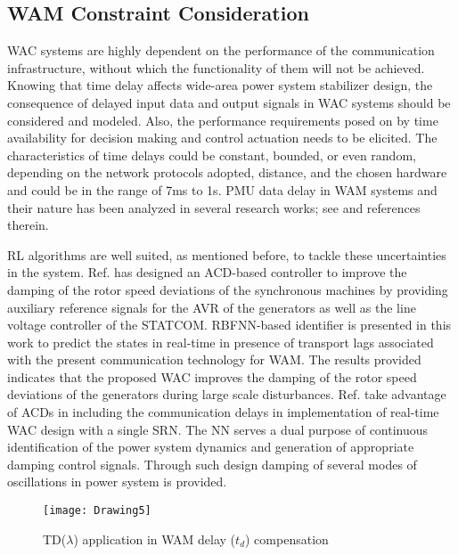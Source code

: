 \documentclass[journal]{IEEEtran}
\begin{document}
\subsection{WAM Constraint Consideration}
WAC systems are highly dependent on the performance of the communication infrastructure, without which the functionality of them  will not be achieved. Knowing that time delay affects wide-area power system stabilizer design, the consequence of delayed input data and output signals in WAC systems should be considered and modeled. Also, the performance requirements posed on by time availability for decision making and control actuation needs to be elicited. The characteristics of time delays could be constant, bounded, or even random, depending on the network protocols adopted, distance, and the chosen hardware and could be in the range of 7ms to 1s. PMU data delay in WAM systems and their nature has been analyzed in several research works; see \cite{4399654,7057655, 7456335} and references therein.


RL algorithms are well suited, as mentioned before, to tackle these uncertainties in the system. Ref. \cite{4162611} has designed an ACD-based controller to improve the damping of the rotor speed deviations of the synchronous machines by providing auxiliary reference signals for the AVR of the generators as well as the line voltage controller of the STATCOM. RBFNN-based identifier is presented in this work to predict the states in real-time in presence of transport lags associated with the present communication technology for WAM. The results provided indicates that the proposed WAC improves the damping of the rotor speed deviations of the generators during large scale disturbances. Ref. \cite{4436106} take advantage of ACDs in including the communication delays in implementation of real-time WAC design with a single SRN. The NN serves a dual purpose of continuous identification of the power system dynamics and generation of appropriate damping control signals. Through such design damping of several modes of oscillations in power system is provided. 



\begin{figure}
  \centering
    \texttt{[image: Drawing5]}
  \caption{TD($\lambda$) application in WAM delay ($t_d$) compensation}
  \label{TD}
\end{figure}
\end{document}
